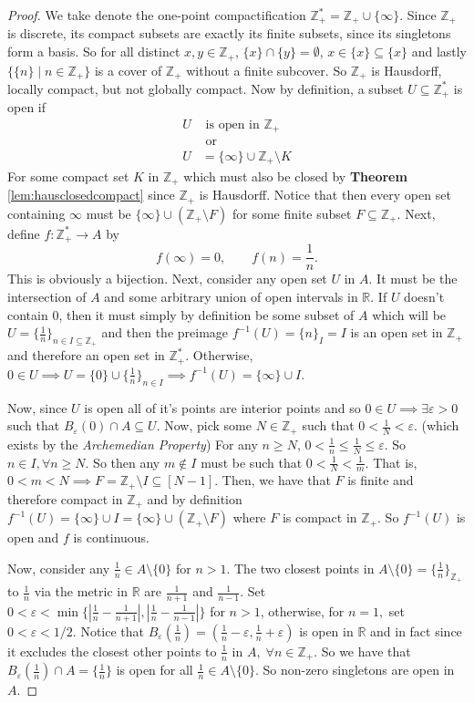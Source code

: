 \documentclass[addpoints,10pt]{exam}
\theoremstyle{plain}
\theoremstyle{definition}
\theoremstyle{plain}
\theoremstyle{definition}
\newcommand{\RR}{\ensuremath{\mathbb{R}}}
\newcommand{\ZZ}{\ensuremath{\mathbb{Z}}}
\begin{document}
\begin{proof} We take denote the one-point compactification
$\ZZ_{+}^{*}=\ZZ_{+}\cup\{\infty\}$. Since $\ZZ_{+}$ is discrete, its compact
subsets are exactly its finite subsets, since its singletons form a basis. So for all distinct $x,y\in \ZZ_{+}$, $\{x\}\cap \{y\}=\emptyset$, $x\in \{x\}\subseteq \{x\}$ and lastly $\{\{n\}\mid n\in \ZZ_{+}\}$ is a cover of $\ZZ_{+}$ without a finite subcover. So $\ZZ_{+}$ is Hausdorff, locally compact, but not globally compact. Now by definition, a subset $U\subseteq \ZZ_{+}^{*}$ is open if
    \begin{align*}
        U&\text{ is open in }\ZZ_{+}\\
        &\text{ or }\\
        U&=\{\infty\}\cup \ZZ_{+}\setminus K
    \end{align*}
For some compact set $K$ in $\ZZ_{+}$ which must also be closed by \textbf{Theorem }\ref{lem:hausclosedcompact} since $\ZZ_{+}$ is Hausdorff. Notice that then every open set containing $\infty$ must be $\{\infty\}\cup (\ZZ_{+}\setminus F)$ for some finite subset $F\subseteq \ZZ_{+}.$
Next, define $f:\ZZ_{+}^{*}\to A$ by
\[
f(\infty)=0,
\qquad
f(n)=\frac1n.
\]
This is obviously a bijection. Next, consider any open set $U$ in $A$. It must be the intersection of $A$ and some arbitrary union of open intervals in $\RR$. If $U$ doesn't contain $0$, then it must simply by definition be some subset of $A$ which will be $U=\{\frac{1}{n}\}_{n\in I\subseteq \ZZ_{+}}$ and then the preimage $f^{-1}(U)=\{n\}_{I}=I$ is an open set in $\ZZ_{+}$ and therefore an open set in $\ZZ_{+}^{*}.$ Otherwise, $0\in U\implies U=\{0\}\cup\{\frac{1}{n}\}_{n\in I}\implies f^{-1}(U)=\{\infty\}\cup I.$

Now, since $U$ is open all of it's points are interior points and so $0\in U\implies \exists\varepsilon>0$ such that $B_{\varepsilon}(0)\cap A\subseteq U.$ Now, pick some $N\in \ZZ_{+}$ such that $0<\frac{1}{N}<\varepsilon$. (which exists by the \textit{Archemedian Property}) For any $n\geq N$, $0< \frac{1}{n}\leq \frac{1}{N}\leq \varepsilon.$ So $n\in I,\forall n\geq N.$ So then any $m\notin I$ must be such that $0<\frac{1}{N}< \frac{1}{m}$. That is, $0<m<N\implies F=\ZZ_{+}\setminus I\subseteq [N-1].$ Then, we have that $F$ is finite and therefore compact in $\ZZ_{+}$ and by definition $f^{-1}(U)=\{\infty\}\cup I=\{\infty\}\cup (\ZZ_{+}\setminus F)$ where $F$ is compact in $\ZZ_{+}.$ So $f^{-1}(U)$ is open and $f$ is continuous.

Now, consider any $\frac{1}{n}\in A\setminus\{0\}$ for $n>1$. The two closest points in $A\setminus\{0\}=\{\frac{1}{n}\}_{\ZZ_{+}}$ to $\frac{1}{n}$ via the metric in $\RR$ are $\frac{1}{n+1}$ and $\frac{1}{n-1}$. Set $0<\varepsilon<\min\{|\frac{1}{n}-\frac{1}{n+1}|,|\frac{1}{n}-\frac{1}{n-1}|\}$ for $n>1$, otherwise, for $n=1,$ set $0<\varepsilon<1/2$. Notice that $B_{\varepsilon}(\frac{1}{n})=(\frac{1}{n}-\varepsilon,\frac{1}{n}+\varepsilon)$ is open in $\RR$ and in fact since it excludes the closest other points to $\frac{1}{n}$ in $A,\;\forall n\in \ZZ_{+}$. So we have that $B_{\varepsilon}(\frac{1}{n})\cap A=\{\frac{1}{n}\}$ is open for all $\frac{1}{n}\in A\setminus\{0\}.$ So non-zero singletons are open in $A.$
 

\end{proof}
\end{document}
